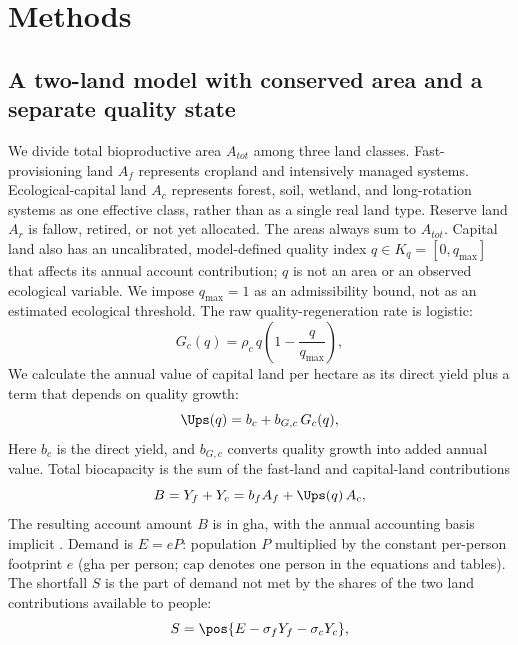 \section{Methods}\label{sec:model}

\subsection{A two-land model with conserved area and a separate quality state}\label{sec:equations}

We divide total bioproductive area $A_{tot}$ among three land classes. Fast-provisioning land $A_f$ represents cropland and intensively managed systems. Ecological-capital land $A_c$ represents forest, soil, wetland, and long-rotation systems as one effective class, rather than as a single real land type. Reserve land $A_r$ is fallow, retired, or not yet allocated. The areas always sum to $A_{tot}$. Capital land also has an uncalibrated, model-defined quality index $q\in K_q=[0,q_{\max}]$ that affects its annual account contribution; $q$ is not an area or an observed ecological variable. We impose $q_{\max}=1$ as an admissibility bound, not as an estimated ecological threshold. The raw quality-regeneration rate is logistic:
\begin{equation}\label{eq:Gc}
G_c(q)=\rho_c\,q\left(1-\frac{q}{q_{\max}}\right),
\end{equation}
We calculate the annual value of capital land per hectare as its direct yield plus a term that depends on quality growth:
\begin{equation}\label{eq:Ups}
\Ups(q)=b_c+b_{G,c}\,G_c(q),
\end{equation}
Here $b_c$ is the direct yield, and $b_{G,c}$ converts quality growth into added annual value. Total biocapacity is the sum of the fast-land and capital-land contributions
\begin{equation}\label{eq:B}
B=Y_f+Y_c=b_f A_f+\Ups(q)\,A_c ,
\end{equation}
The resulting account amount $B$ is in gha, with the annual accounting basis implicit \citep{GFNStandards2009,GFNGuidebook2019}. Demand is $E=eP$: population $P$ multiplied by the constant per-person footprint $e$ (gha per person; $\mathrm{cap}$ denotes one person in the equations and tables). The shortfall $S$ is the part of demand not met by the shares of the two land contributions available to people:
\begin{equation}\label{eq:S}
S=\pos{E-\sigma_f Y_f-\sigma_c Y_c},
\end{equation}
